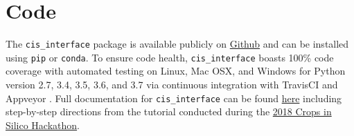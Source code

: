 \documentclass[journal]{IEEEtran}
\newcommand{\todo}[1]{{\color{red}{#1}}}
\newcommand{\cis}{{\tt cis\_interface}{}}
\begin{document}
\section*{Code}\label{S:code}
The {\cis} package is available publicly on \href{https://github.com/cropsinsilico/cis_interface}{Github} and can be 
installed using {\tt pip} or {\tt conda}. To ensure code health, {\cis} boasts 100\% code coverage with automated testing on Linux, Mac OSX, and Windows for Python version 2.7, 3.4, 3.5, 3.6, and 3.7 via continuous integration with TravisCI \citep{travisci} and Appveyor \citep{appveyor}. Full documentation for {\cis} can be found \href{https://cropsinsilico.github.io/cis_interface/}{here} including step-by-step directions from the tutorial conducted during the \href{https://cropsinsilico.github.io/cis_interface/hackathon2018/index.html}{2018 Crops in Silico Hackathon}.


\todo{Fix code citations}
\ifdraft
	
\else
	
\fi

\ifplacefig
\else
\fi

\end{document}

